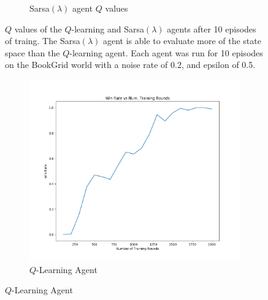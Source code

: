 \documentclass[10pt,conference]{IEEEtran}
\begin{document}
\begin{figure}[h]
\begin{subfigure}[b]{0.40\textwidth}
			\caption{Sarsa\((\lambda)\) agent \(Q\) values}
		\end{subfigure}
		\caption{\(Q\) values of the \(Q\)-learning and Sarsa\((\lambda)\) agents 
		after 10 episodes of traing.  The Sarsa\((\lambda)\) agent is able
		to evaluate more of the state space than the \(Q\)-learning agent.
		Each agent was run for 10 episodes on the BookGrid world with a noise
		rate of 0.2, and epsilon of 0.5.}
		\label{qvalues}
	\end{figure}

	\begin{figure}[h]
		\centering
		\begin{subfigure}[b]{0.40\textwidth}
			\includegraphics[width=\textwidth]{./images/qlearning_winrate}
			\caption{\(Q\)-Learning Agent}
		\end{subfigure}


\end{figure}
\end{document}
